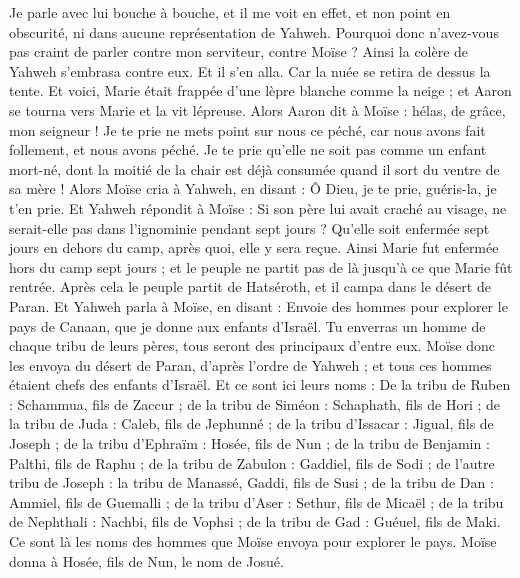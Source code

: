 \begin{multicols}{2}
Je parle avec lui bouche à bouche, et il me voit en effet, et non point en obscurité, ni dans aucune représentation de Yahweh. Pourquoi donc n’avez-vous pas craint de parler contre mon serviteur, contre Moïse ?
Ainsi la colère de Yahweh s'embrasa contre eux. Et il s'en alla.
Car la nuée se retira de dessus la tente. Et voici, Marie était frappée d'une lèpre blanche comme la neige ; et Aaron se tourna vers Marie et la vit lépreuse.
Alors Aaron dit à Moïse : hélas, de grâce, mon seigneur ! Je te prie ne mets point sur nous ce péché, car nous avons fait follement, et nous avons péché.
Je te prie qu'elle ne soit pas comme un enfant mort-né, dont la moitié de la chair est déjà consumée quand il sort du ventre de sa mère !
Alors Moïse cria à Yahweh, en disant : Ô Dieu, je te prie, guéris-la, je t’en prie.
Et Yahweh répondit à Moïse : Si son père lui avait craché au visage, ne serait-elle pas dans l'ignominie pendant sept jours ? Qu'elle soit enfermée sept jours en dehors du camp, après quoi, elle y sera reçue.
Ainsi Marie fut enfermée hors du camp sept jours ; et le peuple ne partit pas de là jusqu'à ce que Marie fût rentrée.
Après cela le peuple partit de Hatséroth, et il campa dans le désert de Paran.
\VerseOne{}Et Yahweh parla à Moïse, en disant :
Envoie des hommes pour explorer le pays de Canaan, que je donne aux enfants d'Israël. Tu enverras un homme de chaque tribu de leurs pères, tous seront des principaux d'entre eux.
Moïse donc les envoya du désert de Paran, d'après l'ordre de Yahweh ; et tous ces hommes étaient chefs des enfants d'Israël.
Et ce sont ici leurs noms : De la tribu de Ruben : Schammua, fils de Zaccur ;
de la tribu de Siméon : Schaphath, fils de Hori ;
de la tribu de Juda : Caleb, fils de Jephunné ;
de la tribu d'Issacar : Jigual, fils de Joseph ;
de la tribu d'Ephraïm : Hosée, fils de Nun ;
de la tribu de Benjamin : Palthi, fils de Raphu ;
de la tribu de Zabulon : Gaddiel, fils de Sodi ;
de l'autre tribu de Joseph : la tribu de Manassé, Gaddi, fils de Susi ;
de la tribu de Dan : Ammiel, fils de Guemalli ;
de la tribu d'Aser : Sethur, fils de Micaël ;
de la tribu de Nephthali : Nachbi, fils de Vophsi ;
de la tribu de Gad : Guéuel, fils de Maki.
Ce sont là les noms des hommes que Moïse envoya pour explorer le pays. Moïse donna à Hosée, fils de Nun, le nom de Josué.

\end{multicols}
